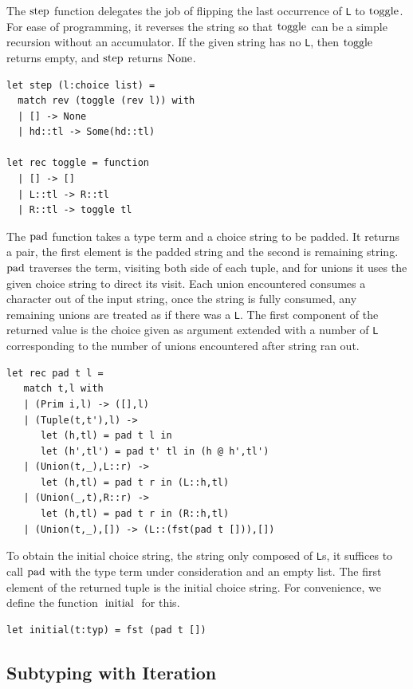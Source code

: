 \documentclass[a4paper,english]{lipics-v2019}
\renewcommand{\L}{{\tt L}\xspace}
\newcommand{\Ls}{{\tt L}s\xspace}
\renewcommand{\c}[1]{\ensuremath{\text{\lstinline{#1}}}\xspace}
\begin{document}
\noindent
The \c{step} function delegates the job of flipping the last occurrence of
\L to \c{toggle}. For ease of programming, it reverses the string so that
\c{toggle} can be a simple recursion without an accumulator.  If the given
string has no \L, then \c{toggle} returns empty, and \c{step} returns
\c{None}.
\newpage

\begin{lstlisting}
let step (l:choice list) =
  match rev (toggle (rev l)) with
  | [] -> None
  | hd::tl -> Some(hd::tl)

let rec toggle = function
  | [] -> []    
  | L::tl -> R::tl
  | R::tl -> toggle tl
\end{lstlisting}

The \c{pad} function takes a type term and a choice string to be padded. It
returns a pair, the first element is the padded string and the second is
remaining string. \c{pad} traverses the term, visiting both side of each
tuple, and for unions it uses the given choice string to direct its visit.
Each union encountered consumes a character out of the input string, once
the string is fully consumed, any remaining unions are treated as if there
was a \L. The first component of the returned value is the choice given as
argument extended with a number of \L corresponding to the number of unions
encountered after string ran out.

\begin{lstlisting}
let rec pad t l =
   match t,l with
   | (Prim i,l) -> ([],l)
   | (Tuple(t,t'),l) -> 
      let (h,tl) = pad t l in
      let (h',tl') = pad t' tl in (h @ h',tl')
   | (Union(t,_),L::r) -> 
      let (h,tl) = pad t r in (L::h,tl)
   | (Union(_,t),R::r) -> 
      let (h,tl) = pad t r in (R::h,tl)
   | (Union(t,_),[]) -> (L::(fst(pad t [])),[])
\end{lstlisting}

To obtain the initial choice string, the string only composed of \Ls, it
suffices to call \c{pad} with the type term under consideration and an empty
list. The first element of the returned tuple is the initial choice
string. For convenience, we define the function \c{initial} for this.

\begin{lstlisting}
let initial(t:typ) = fst (pad t [])
\end{lstlisting}

\subsection{Subtyping with Iteration}
\end{document}
